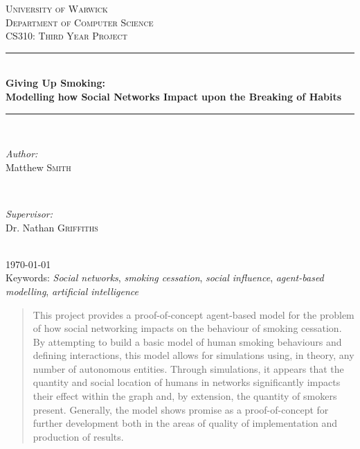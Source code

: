 \documentclass[]{report}
\begin{document}
\linespread{1.3}
\begin{titlepage}
\newcommand{\HRule}{\rule{\linewidth}{0.5mm}} %

\center
\textsc{\LARGE University of Warwick}\\[1.5cm]
\textsc{\Large Department of Computer Science}\\[0.5cm]
\textsc{\large CS310: Third Year Project}\\[0.5cm]
\HRule \\
{ \huge \bfseries Giving Up Smoking: \\Modelling how Social Networks Impact upon the Breaking of Habits}\\[0.4cm] %
\HRule \\[1.5cm]
\begin{minipage}{0.4\textwidth}
\begin{flushleft} \large
\emph{Author:}\\
Matthew \textsc{Smith} %
\end{flushleft}
\end{minipage}
~
\begin{minipage}{0.4\textwidth}
\begin{flushright} \large
\emph{Supervisor:} \\
Dr. Nathan \textsc{Griffiths} %
\end{flushright}
\end{minipage}\\[4cm]


{\large \today}\\[3cm]

{\large Keywords: \emph{Social networks}, \emph{smoking cessation}, \emph{social influence}, \emph{agent-based modelling}, \emph{artificial intelligence}}\\[3cm]

\vfill

\end{titlepage}

\begin{abstract}
This project provides a proof-of-concept agent-based model for the problem of how social networking impacts on the behaviour of smoking cessation. By attempting to build a basic model of human smoking behaviours and defining interactions, this model allows for  simulations using, in theory, any number of autonomous entities. Through simulations, it appears that the quantity and social location of humans in networks significantly impacts their effect within the graph and, by extension, the quantity of smokers present. Generally, the model shows promise as a proof-of-concept for further development both in the areas of quality of implementation and production of results.
\end{abstract}
\end{document}
